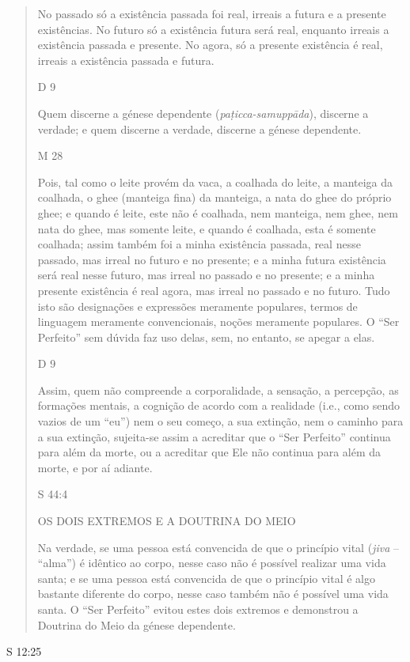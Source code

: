 \begin{quote}
No passado só a existência passada foi real, irreais a futura e a presente existências. No futuro só a existência futura será real, enquanto irreais a existência passada e presente. No agora, só a presente existência é real, irreais a existência passada e futura.

D 9

Quem discerne a génese dependente (\emph{paṭicca-samuppāda}), discerne a verdade; e quem discerne a verdade, discerne a génese dependente.

M 28

Pois, tal como o leite provém da vaca, a coalhada do leite, a manteiga da coalhada, o ghee (manteiga fina) da manteiga, a nata do ghee do próprio ghee; e quando é leite, este não é coalhada, nem manteiga, nem ghee, nem nata do ghee, mas somente leite, e quando é coalhada, esta é somente coalhada; assim também foi a minha existência passada, real nesse passado, mas irreal no futuro e no presente; e a minha futura existência será real nesse futuro, mas irreal no passado e no presente; e a minha presente existência é real agora, mas irreal no passado e no futuro. Tudo isto são designações e expressões meramente populares, termos de linguagem meramente convencionais, noções meramente populares. O ``Ser Perfeito'' sem dúvida faz uso delas, sem, no entanto, se apegar a elas.

D 9

Assim, quem não compreende a corporalidade, a sensação, a percepção, as formações mentais, a cognição de acordo com a realidade (i.e., como sendo vazios de um ``eu'') nem o seu começo, a sua extinção, nem o caminho para a sua extinção, sujeita-se assim a acreditar que o ``Ser Perfeito'' continua para além da morte, ou a acreditar que Ele não continua para além da morte, e por aí adiante.

S 44:4

OS DOIS EXTREMOS E A DOUTRINA DO MEIO

Na verdade, se uma pessoa está convencida de que o princípio vital (\emph{jiva} -- ``alma'') é idêntico ao corpo, nesse caso não é possível realizar uma vida santa; e se uma pessoa está convencida de que o princípio vital é algo bastante diferente do corpo, nesse caso também não é possível uma vida santa. O ``Ser Perfeito'' evitou estes dois extremos e demonstrou a Doutrina do Meio da génese dependente.
\end{quote}

S 12:25

